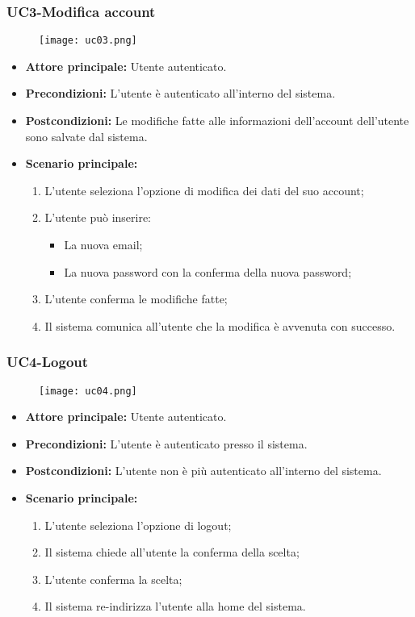 \pagebreak
\subsubsection{UC3-Modifica account }
\begin{figure}[h] \texttt{[image: uc03.png]} \end{figure}
\begin{itemize}
    \item \textbf{Attore principale:} Utente autenticato.
    \item \textbf{Precondizioni:} L'utente è autenticato all'interno del sistema.
    \item \textbf{Postcondizioni:} Le modifiche fatte alle informazioni dell'account dell'utente sono
    salvate dal sistema.
    \item \textbf{Scenario principale:}
        \begin{enumerate}
            \item L'utente seleziona l'opzione di modifica dei dati del suo account;
            \item L'utente può inserire:
              \begin{itemize}
                \item La nuova email;
                \item La nuova password con la conferma della nuova password;
              \end{itemize}
            \item L'utente conferma le modifiche fatte;
            \item Il sistema comunica all'utente che la modifica è avvenuta con successo.
        \end{enumerate}
\end{itemize}

\subsubsection{UC4-Logout}
\begin{figure}[h] \texttt{[image: uc04.png]} \end{figure}
\begin{itemize}
    \item \textbf{Attore principale:} Utente autenticato.
    \item \textbf{Precondizioni:} L'utente è autenticato presso il sistema.
    \item \textbf{Postcondizioni:} L'utente non è più autenticato all'interno del sistema.
    \item \textbf{Scenario principale:}
    \begin{enumerate}
        \item L'utente seleziona l'opzione di logout;
        \item Il sistema chiede all'utente la conferma della scelta;
        \item L'utente conferma la scelta;
        \item Il sistema re-indirizza l'utente alla home del sistema.
    \end{enumerate}
\end{itemize}

